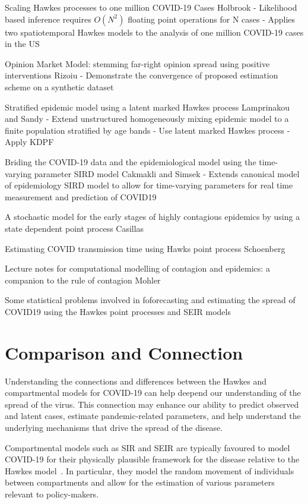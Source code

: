 \documentclass[12pt]{article}
\begin{document}
Scaling Hawkes processes to one million COVID-19 Cases
Holbrook
- Likelihood based inference requires $O(N^2)$ floating point operations for N cases
- Applies two spatiotemporal Hawkes models to the analysis of one million COVID-19 cases in the US


Opinion Market Model: stemming far-right opinion spread using positive interventions
Rizoiu
- Demonstrate the convergence of proposed estimation scheme on a synthetic dataset


Stratified epidemic model using a latent marked Hawkes process
Lamprinakou and Sandy
- Extend unstructured homogeneously mixing epidemic model to a finite population stratified by age bands
- Use latent marked Hawkes process
- Apply KDPF

Briding the COVID-19 data and the epidemiological model using the time-varying parameter SIRD model
Cakmakli and Simsek
- Extends canonical model of epidemiology SIRD model to allow for time-varying parameters for real time measurement and prediction of COVID19


A stochastic model for the early stages of highly contagious epidemics by using a state dependent point process
Casillas


Estimating COVID transmission time using Hawks point process
Schoenberg


Lecture notes for computational modelling of contagion and epidemics: a companion to the rule of contagion 
Mohler


Some statistical problems involved in foforecasting and estimating the spread of COVID19 using the Hawkes point processes and SEIR models






\section{Comparison and Connection}

Understanding the connections and differences between the Hawkes and compartmental models for COVID-19 can help deepend our understanding of the spread of the virus. This connection may enhance our ability to predict observed and latent cases, estimate pandemic-related parameters, and help understand the underlying mechanisms that drive the spread of the disease. 

Compartmental models such as SIR and SEIR are typically favoured to model COVID-19 for their physically plausible framework for the disease relative to the Hawkes model~\cite{Kresin2022}. In particular, they model the random movement of individuals between compartments and allow for the estimation of various parameters relevant to policy-makers. 
\end{document}
